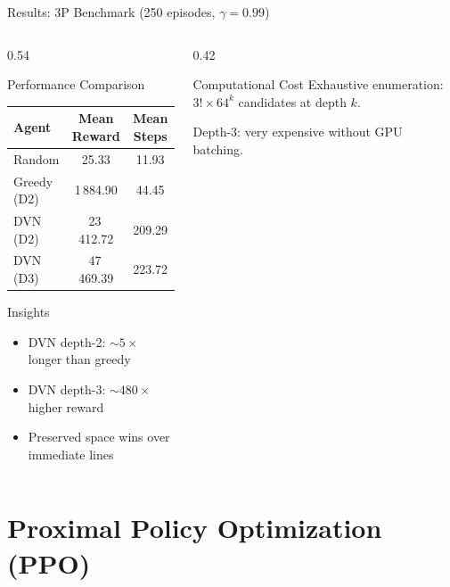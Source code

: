 \documentclass[aspectratio=169,10pt]{beamer}
\begin{document}
\begin{frame}{Results: 3P Benchmark (250 episodes, $\gamma=0.99$)}
\begin{columns}[T]
\begin{column}{0.54\textwidth}
\begin{block}{Performance Comparison}
\begin{tabular}{lcc}
\toprule
Agent & Mean Reward & Mean Steps \\
\midrule
Random & 25.33 & 11.93 \\
Greedy (D2) & 1\,884.90 & 44.45 \\
DVN (D2) & 23\,412.72 & 209.29 \\
DVN (D3) & 47\,469.39 & 223.72 \\
\bottomrule
\end{tabular}
\end{block}

\vspace{0.5em}
\begin{exampleblock}{Insights}
\begin{itemize}
    \item DVN depth-2: $\sim 5\times$ longer than greedy
    \item DVN depth-3: $\sim 480\times$ higher reward
    \item Preserved space wins over immediate lines
\end{itemize}
\end{exampleblock}
\end{column}

\begin{column}{0.42\textwidth}
\begin{alertblock}{Computational Cost}
Exhaustive enumeration: $3! \times 64^k$ candidates at depth $k$.

\vspace{0.3em}
Depth-3: very expensive without GPU batching.
\end{alertblock}
\end{column}
\end{columns}
\end{frame}

\section{Proximal Policy Optimization (PPO)}
\end{document}
